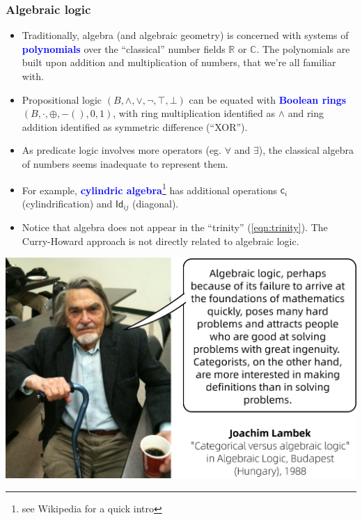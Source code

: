 \documentclass[16pt]{beamer}
\let\oldtextbf\textbf
\renewcommand{\textbf}[1]{\textcolor{blue}{\oldtextbf{#1}}}
\begin{document}
\begin{frame}
\frametitle{Algebraic logic}
\begin{itemize}
	\item Traditionally, algebra (and algebraic geometry) is concerned with systems of \textbf{polynomials} over the ``classical'' number fields $\mathbb{R}$ or $\mathbb{C}$.  The polynomials are built upon addition and multiplication of numbers, that we're all familiar with.
	\item Propositional logic $(B, \wedge, \vee, \neg, \top, \bot)$ can be equated with \textbf{Boolean rings} $(B, \cdot, \oplus, -(), 0, 1)$, with ring multiplication identified as $\wedge$ and ring addition identified as symmetric difference (``XOR'').
	\item As predicate logic involves more operators (eg. $\forall$ and $\exists$), the classical algebra of numbers seems inadequate to represent them.
	\item For example, \textbf{cylindric algebra}\footnote{see Wikipedia for a quick intro} has additional operations $\mathsf{c}_i$ (cylindrification) and $\mathsf{Id}_{ij}$ (diagonal).
	\item Notice that algebra does not appear in the ``trinity'' (\ref{eqn:trinity}).  The Curry-Howard approach is not directly related to algebraic logic.
\end{itemize}
\end{frame}

\begin{frame}
\centering
\includegraphics[scale=0.45]{Lambek-quote.png}
\end{frame}
\end{document}
